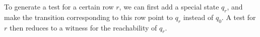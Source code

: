 To generate a test for a certain row $r$, we can first add a special state $q_r$, and make the transition corresponding to this row point to $q_r$ instead of $q_0$. A test  for $r$ then reduces to a witness for the reachability of $q_r$. 

%


